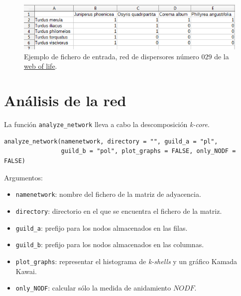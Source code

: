 \begin{figure}[h!]
\centering
\includegraphics[scale=0.8]{ManFigs/SD_029_csv.png}
\caption {Ejemplo de fichero de entrada, red de dispersores número $029$ de la \href{http://www.web-of-life.es/}{web of life}.}
\label{fig:AKMAN_red_example}
\end{figure}

\section{Análisis de la red}
\label{network_analysis}

La función \texttt{analyze\_network} lleva a cabo la descomposición \textit{k-core}.

\fontsize{3.5mm}{3.5mm}\selectfont
\begin{verbatim}
analyze_network(namenetwork, directory = "", guild_a = "pl",
                guild_b = "pol", plot_graphs = FALSE, only_NODF = FALSE)
\end{verbatim}
\normalsize

Argumentos:
\small
\begin{itemize}

\item \texttt{namenetwork}: nombre del fichero de la matriz de adyacencia.
	
\item \texttt{directory}: directorio en el que se encuentra el fichero de la matriz.

\item \texttt{guild\_a}: prefijo para los nodos almacenados en las filas.

\item \texttt{guild\_b}: prefijo para los nodos almacenados en las columnas.

\item \texttt{plot\_graphs}: representar el histograma de \textit{k-shells} y un gráfico Kamada Kawai.

\item \texttt{only\_NODF}: calcular sólo la medida de anidamiento $NODF$.

\end{itemize}

